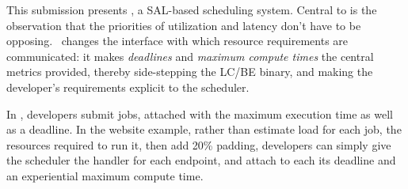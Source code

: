 This submission presents \textit{\sysname}, a SAL-based scheduling system.
Central to \sysname{} is the observation that the priorities of utilization and
latency don't have to be opposing.\ \sysname{} changes the interface with which
resource requirements are communicated: it makes \textit{deadlines} and
\textit{maximum compute times} the central metrics provided, thereby
side-stepping the LC/BE binary, and making the developer's requirements explicit
to the scheduler.

In \sysname{}, developers submit jobs, attached with the maximum execution time
as well as a deadline. In the website example, rather than estimate load for
each job, the resources required to run it, then add 20\% padding, developers
can simply give the scheduler the handler for each endpoint, and attach to each
its deadline and an experiential maximum compute time.